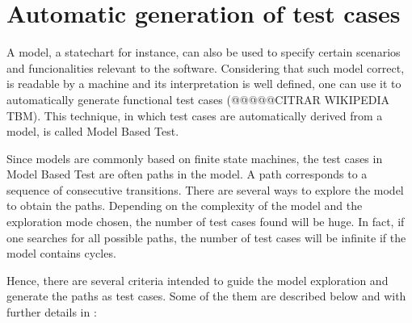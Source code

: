 \section{Automatic generation of test cases}
\label{sec-autotestcases}

A model, a statechart for instance, can also be used to specify certain scenarios and funcionalities relevant to the software. Considering that such model correct, is readable by a machine and its interpretation is well defined, one can use it to automatically generate functional test cases \cite{Maldonado:07}(@@@@@CITRAR WIKIPEDIA TBM). This technique, in which test cases are automatically derived from a model, is called Model Based Test.

Since models are commonly based on finite state machines, the test cases in Model Based Test are often paths in the model. A path corresponds to a sequence of consecutive transitions. There are several ways to explore the model to obtain the paths. Depending on the complexity of the model and the exploration mode chosen, the number of test cases found will be huge. In fact, if one searches for all possible paths, the number of test cases will be infinite if the model contains cycles.

Hence, there are several criteria intended to guide the model exploration and generate the paths as test cases. Some of the them are described below and with further details in \cite{inpe10}:

